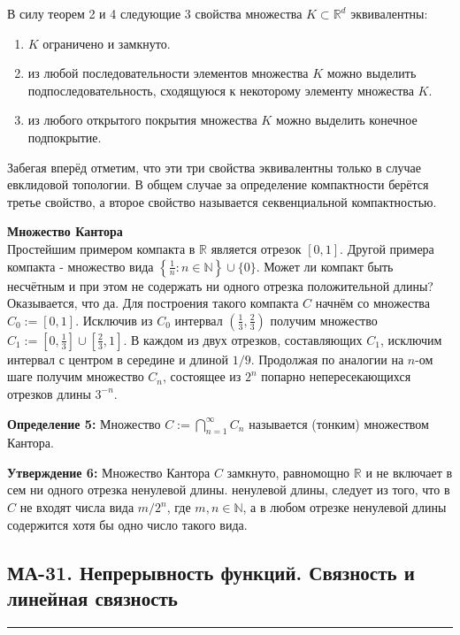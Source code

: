 \documentclass[a4paper,12pt]{article} %
\newcommand{\HRule}{\rule{\linewidth}{0.5mm}}
\begin{document}
В силу теорем 2 и 4 следующие 3 свойства множества $K \subset \mathbb{R}^{d}$ эквивалентны:

\begin{enumerate}
  \item $K$ ограничено и замкнуто.

  \item из любой последовательности элементов множества $K$ можно выделить подпоследовательность, сходящуюся к некоторому элементу множества $K$.

  \item из любого открытого покрытия множества $K$ можно выделить конечное подпокрытие.

\end{enumerate}

Забегая вперёд отметим, что эти три свойства эквивалентны только в случае евклидовой топологии. В общем случае за определение компактности берётся третье свойство, а второе свойство называется секвенциальной компактностью.

\textbf{Множество Кантора}\\
Простейшим примером компакта в $\mathbb{R}$ является отрезок $[0,1]$. Другой примера компакта - множество вида $\left\{\frac{1}{n}: n \in \mathbb{N}\right\} \cup\{0\}$. Может ли компакт быть несчётным и при этом не содержать ни одного отрезка положительной длины? Оказывается, что да. Для построения такого компакта $C$ начнём со множества $C_{0}:=[0,1]$. Исключив из $C_{0}$ интервал $\left(\frac{1}{3}, \frac{2}{3}\right)$ получим множество $C_{1}:=\left[0, \frac{1}{3}\right] \cup\left[\frac{2}{3}, 1\right]$. В каждом из двух отрезков, составляющих $C_{1}$, исключим интервал с центром в середине и длиной $1 / 9$. Продолжая по аналогии на $n$-ом шаге получим множество $C_{n}$, состоящее из $2^{n}$ попарно непересекающихся отрезков длины $3^{-n}$.

\textbf{Определение 5:} Множество $C:=\bigcap_{n=1}^{\infty} C_{n}$ называется (тонким) множеством Кантора.

\textbf{Утверждение 6:} Множество Кантора $C$ замкнуто, равномощно $\mathbb{R}$ и не включает в сем ни одного отрезка ненулевой длины.
ненулевой длины, следует из того, что в $C$ не входят числа вида $m / 2^{n}$, где $m, n \in \mathbb{N}$, а в любом отрезке ненулевой длины содержится хотя бы одно число такого вида.

	\newpage

	\begin{LARGE}
		\begin{center}
			\section{МА-31. Непрерывность функций. Связность и линейная связность}
		\end{center}
	\end{LARGE}
	\HRule \\
\end{document}
